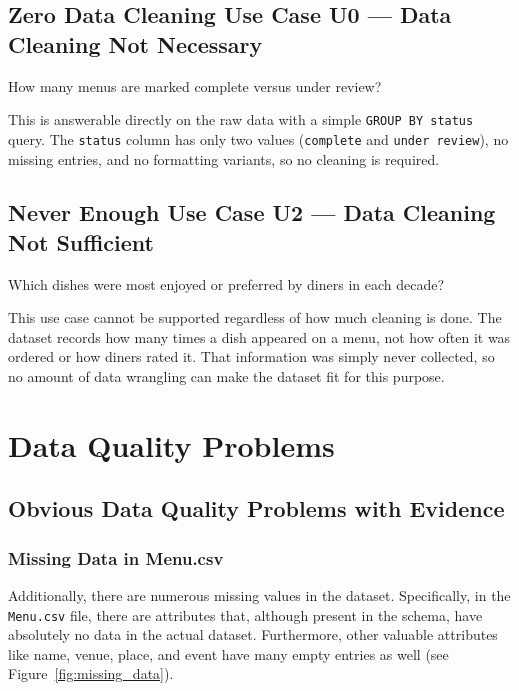 \documentclass[11pt]{article}
\begin{document}
\subsection{Zero Data Cleaning Use Case U0 --- Data Cleaning Not Necessary}  %
\label{sec:u0}

How many menus are marked complete versus under review?

This is answerable directly on the raw data with a simple \texttt{GROUP BY status}
query. The \texttt{status} column has only two values (\texttt{complete} and
\texttt{under review}), no missing entries, and no formatting variants, so no
cleaning is required.

\subsection{Never Enough Use Case U2 --- Data Cleaning Not Sufficient}  %
\label{sec:u2}

Which dishes were most enjoyed or preferred by diners in each decade?

This use case cannot be supported regardless of how much cleaning is done. The
dataset records how many times a dish appeared on a menu, not how often it was
ordered or how diners rated it. That information was simply never collected, so
no amount of data wrangling can make the dataset fit for this purpose.

\section{Data Quality Problems}  %
\label{sec:dq_problems}

\subsection{Obvious Data Quality Problems with Evidence}  %

\subsubsection*{Missing Data in Menu.csv}
Additionally, there are numerous missing values in the dataset. Specifically, in the
\texttt{Menu.csv} file, there are attributes that, although present in the schema,
have absolutely no data in the actual dataset. Furthermore, other valuable attributes
like name, venue, place, and event have many empty entries as well
(see Figure~\ref{fig:missing_data}).
\end{document}
